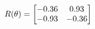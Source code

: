 \documentclass[preview]{standalone}
\begin{document}
\begin{align*}
\special{dvisvgm:raw <g id='unique000'>}R(\theta) = \begin{bmatrix}-0.36 & 0.93\\-0.93 & -0.36\end{bmatrix}\special{dvisvgm:raw </g>}
\end{align*}
\end{document}
